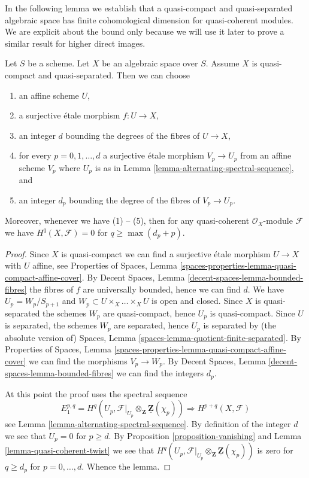 \noindent
In the following lemma we establish that a quasi-compact and
quasi-separated algebraic space has finite cohomological dimension
for quasi-coherent modules. We are explicit about the bound only because
we will use it later to prove a similar result for higher direct
images.

\begin{lemma}
\label{lemma-vanishing-quasi-separated}
Let $S$ be a scheme. Let $X$ be an algebraic space over $S$.
Assume $X$ is quasi-compact and quasi-separated.
Then we can choose
\begin{enumerate}
\item an affine scheme $U$,
\item a surjective \'etale morphism $f : U \to X$,
\item an integer $d$ bounding the degrees of the fibres of $U \to X$,
\item for every $p = 0, 1, \ldots, d$ a surjective \'etale morphism
$V_p \to U_p$ from an affine scheme $V_p$ where $U_p$ is as in
Lemma \ref{lemma-alternating-spectral-sequence}, and
\item an integer $d_p$ bounding the degree of the fibres of $V_p \to U_p$.
\end{enumerate}
Moreover, whenever we have (1) -- (5), then for any quasi-coherent
$\mathcal{O}_X$-module $\mathcal{F}$ we have $H^q(X, \mathcal{F}) = 0$ for
$q \geq \max(d_p + p)$.
\end{lemma}

\begin{proof}
Since $X$ is quasi-compact we can find a surjective \'etale morphism
$U \to X$ with $U$ affine, see
Properties of Spaces, Lemma
\ref{spaces-properties-lemma-quasi-compact-affine-cover}.
By
Decent Spaces, Lemma \ref{decent-spaces-lemma-bounded-fibres}
the fibres of $f$ are universally bounded, hence we can find $d$.
We have $U_p = W_p/S_{p + 1}$ and $W_p \subset U \times_X \ldots \times_X U$
is open and closed. Since $X$ is quasi-separated the schemes
$W_p$ are quasi-compact, hence $U_p$ is quasi-compact.
Since $U$ is separated, the schemes $W_p$ are separated, hence
$U_p$ is separated by (the absolute version of)
Spaces, Lemma \ref{spaces-lemma-quotient-finite-separated}.
By
Properties of Spaces, Lemma
\ref{spaces-properties-lemma-quasi-compact-affine-cover}
we can find the morphisms $V_p \to W_p$.
By
Decent Spaces, Lemma \ref{decent-spaces-lemma-bounded-fibres}
we can find the integers $d_p$.

\medskip\noindent
At this point the proof uses the spectral sequence
$$
E_1^{p, q} =
H^q(U_p, \mathcal{F}|_{U_p} \otimes_\mathbf{Z} \underline{\mathbf{Z}}(\chi_p))
\Rightarrow
H^{p + q}(X, \mathcal{F})
$$
see
Lemma \ref{lemma-alternating-spectral-sequence}.
By definition of the integer $d$ we see that $U_p = 0$ for $p \geq d$.
By Proposition \ref{proposition-vanishing}
and
Lemma \ref{lemma-quasi-coherent-twist}
we see that
$H^q(U_p,
\mathcal{F}|_{U_p} \otimes_\mathbf{Z} \underline{\mathbf{Z}}(\chi_p))$
is zero for $q \geq d_p$ for $p = 0, \ldots, d$.
Whence the lemma.
\end{proof}










